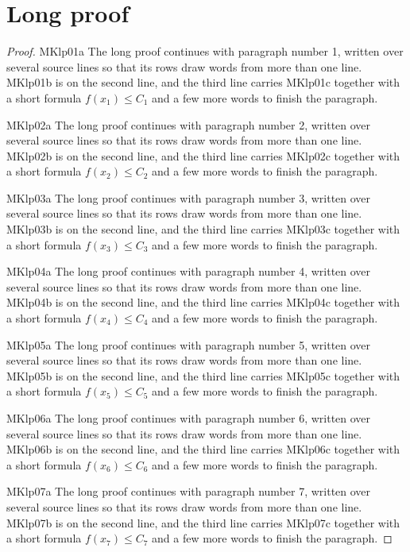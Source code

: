 \documentclass{article}
\begin{document}
\section{Long proof}
\begin{proof}
MKlp01a The long proof continues with paragraph number 1, written over several
source lines so that its rows draw words from more than one line. MKlp01b is on
the second line, and the third line carries MKlp01c together with a short formula
$f(x_1) \le C_1$ and a few more words to finish the paragraph.

MKlp02a The long proof continues with paragraph number 2, written over several
source lines so that its rows draw words from more than one line. MKlp02b is on
the second line, and the third line carries MKlp02c together with a short formula
$f(x_2) \le C_2$ and a few more words to finish the paragraph.

MKlp03a The long proof continues with paragraph number 3, written over several
source lines so that its rows draw words from more than one line. MKlp03b is on
the second line, and the third line carries MKlp03c together with a short formula
$f(x_3) \le C_3$ and a few more words to finish the paragraph.

MKlp04a The long proof continues with paragraph number 4, written over several
source lines so that its rows draw words from more than one line. MKlp04b is on
the second line, and the third line carries MKlp04c together with a short formula
$f(x_4) \le C_4$ and a few more words to finish the paragraph.

MKlp05a The long proof continues with paragraph number 5, written over several
source lines so that its rows draw words from more than one line. MKlp05b is on
the second line, and the third line carries MKlp05c together with a short formula
$f(x_5) \le C_5$ and a few more words to finish the paragraph.

MKlp06a The long proof continues with paragraph number 6, written over several
source lines so that its rows draw words from more than one line. MKlp06b is on
the second line, and the third line carries MKlp06c together with a short formula
$f(x_6) \le C_6$ and a few more words to finish the paragraph.

MKlp07a The long proof continues with paragraph number 7, written over several
source lines so that its rows draw words from more than one line. MKlp07b is on
the second line, and the third line carries MKlp07c together with a short formula
$f(x_7) \le C_7$ and a few more words to finish the paragraph.


\end{proof}
\end{document}
